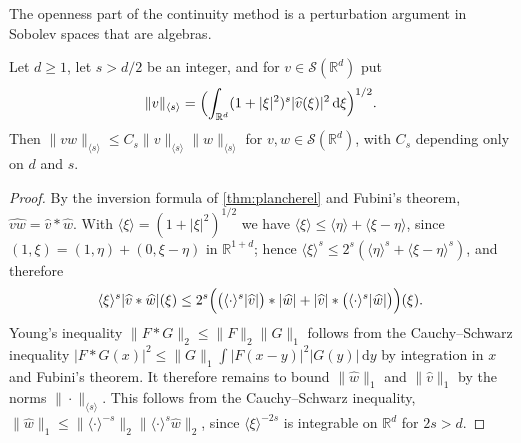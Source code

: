 The openness part of the continuity method is a perturbation argument in Sobolev spaces that are algebras.

\begin{lemma}\label{lem:sobolev-multiplication}
Let $d\geq1$, let $s>d/2$ be an integer, and for $v\in\mathcal S(\mathbb R^d)$ put
\[
 \|v\|_{\langle s\rangle}=\Bigl(\int_{\mathbb R^d}(1+|\xi|^2)^s|\widehat v(\xi)|^2\,\mathrm d\xi\Bigr)^{1/2}.
\]
Then $\|vw\|_{\langle s\rangle}\leq C_s\|v\|_{\langle s\rangle}\|w\|_{\langle s\rangle}$ for $v,w\in\mathcal S(\mathbb R^d)$, with $C_s$ depending only on $d$ and $s$.
\end{lemma}
\begin{proof}
By the inversion formula of \cref{thm:plancherel} and Fubini's theorem, $\widehat{vw}=\widehat v*\widehat w$. With $\langle\xi\rangle=(1+|\xi|^2)^{1/2}$ we have $\langle\xi\rangle\leq\langle\eta\rangle+\langle\xi-\eta\rangle$, since $(1,\xi)=(1,\eta)+(0,\xi-\eta)$ in $\mathbb R^{1+d}$; hence $\langle\xi\rangle^s\leq2^s(\langle\eta\rangle^s+\langle\xi-\eta\rangle^s)$, and therefore
\[
 \langle\xi\rangle^s|\widehat v*\widehat w|(\xi)
 \leq2^s\Bigl(\bigl(\langle\cdot\rangle^s|\widehat v|\bigr)*|\widehat w|
        +|\widehat v|*\bigl(\langle\cdot\rangle^s|\widehat w|\bigr)\Bigr)(\xi).
\]
Young's inequality $\|F*G\|_2\leq\|F\|_2\|G\|_1$ follows from the Cauchy--Schwarz inequality $|F*G(x)|^2\leq\|G\|_1\int|F(x-y)|^2|G(y)|\,\mathrm dy$ by integration in $x$ and Fubini's theorem. It therefore remains to bound $\|\widehat w\|_1$ and $\|\widehat v\|_1$ by the norms $\|\cdot\|_{\langle s\rangle}$. This follows from the Cauchy--Schwarz inequality, $\|\widehat w\|_1\leq\|\langle\cdot\rangle^{-s}\|_2\|\langle\cdot\rangle^s\widehat w\|_2$, since $\langle\xi\rangle^{-2s}$ is integrable on $\mathbb R^d$ for $2s>d$.
\end{proof}

